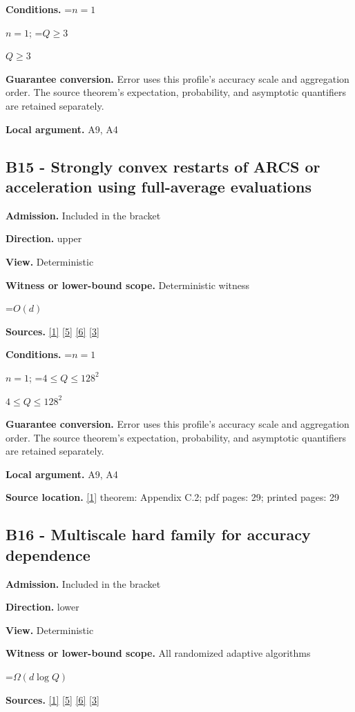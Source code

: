 \documentclass[10pt,a4paper]{article}
\newcommand{\AtlasMath}[1]{\par\begingroup\centering\setbox0=\hbox{$\displaystyle #1$}\ifdim\wd0>1.4\linewidth\typeout{ATLAS WIDE FORMULA: \the\wd0}\fi\ifdim\wd0>\linewidth\resizebox{\linewidth}{!}{\box0}\else\box0\fi\par\endgroup}
\newcommand{\AtlasInlineMath}[1]{\begingroup\setbox0=\hbox{$#1$}\ifdim\wd0>.4\linewidth\endgroup\AtlasMath{#1}\else\endgroup$#1$\fi}
\begin{document}
\textbf{Conditions.} \AtlasInlineMath{n=1}; \AtlasInlineMath{Q\ge3}

\textbf{Guarantee conversion.} Error uses this profile's accuracy scale and aggregation order. The source theorem's expectation, probability, and asymptotic quantifiers are retained separately.

\textbf{Local argument.} A9, A4

\subsection{B15 - Strongly convex restarts of ARCS or acceleration using full-average evaluations}
\textbf{Admission.} Included in the bracket

\textbf{Direction.} upper

\textbf{View.} Deterministic

\textbf{Witness or lower-bound scope.} Deterministic witness

\AtlasMath{O(d)}
\textbf{Sources.} \href{https://arxiv.org/html/2610.00345v1}{[1]} \href{https://arxiv.org/html/2607.16558v2}{[5]} \href{https://www.mathnet.ru/php/archive.phtml?jrnid=mzm&option_lang=eng&paperid=1697&wshow=paper}{[6]} \href{https://arxiv.org/abs/2109.08858}{[3]}

\textbf{Conditions.} \AtlasInlineMath{n=1}; \AtlasInlineMath{4\le Q\le128^2}

\textbf{Guarantee conversion.} Error uses this profile's accuracy scale and aggregation order. The source theorem's expectation, probability, and asymptotic quantifiers are retained separately.

\textbf{Local argument.} A9, A4

\textbf{Source location.} \href{https://arxiv.org/html/2610.00345v1}{[1]} theorem: Appendix C.2; pdf pages: 29; printed pages: 29

\subsection{B16 - Multiscale hard family for accuracy dependence}
\textbf{Admission.} Included in the bracket

\textbf{Direction.} lower

\textbf{View.} Deterministic

\textbf{Witness or lower-bound scope.} All randomized adaptive algorithms

\AtlasMath{\Omega(d\log Q)}
\textbf{Sources.} \href{https://arxiv.org/html/2610.00345v1}{[1]} \href{https://arxiv.org/html/2607.16558v2}{[5]} \href{https://www.mathnet.ru/php/archive.phtml?jrnid=mzm&option_lang=eng&paperid=1697&wshow=paper}{[6]} \href{https://arxiv.org/abs/2109.08858}{[3]}
\end{document}
